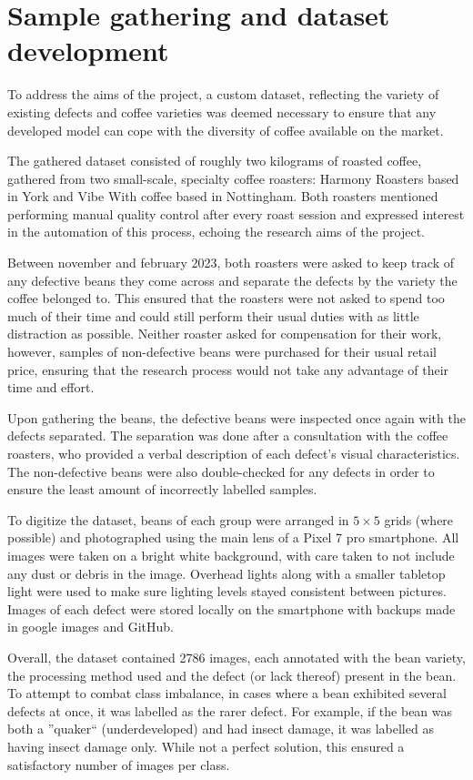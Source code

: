 \section{Sample gathering and dataset development}
\label{sec:sample-gathering-and-dataset-development}
To address the aims of the project, a custom dataset,
reflecting the variety of existing defects and coffee varieties was deemed necessary to
ensure that any developed model can cope with the diversity of coffee available
on the market.

The gathered dataset consisted of roughly two kilograms of roasted coffee, gathered
from two small-scale, specialty coffee roasters: Harmony Roasters based in York and Vibe
With coffee based in Nottingham.
Both roasters mentioned performing manual quality control
after every roast session and expressed interest in the automation of this process,
echoing the research aims of the project.

Between november and february 2023, both roasters were asked
to keep track of any defective beans they come across and separate the defects by
the variety the coffee belonged to.
This ensured that the roasters were not
asked to spend too much of their time and could still perform their usual duties
with as little distraction as possible.
Neither roaster asked for compensation for
their work, however, samples of non-defective beans were purchased for their usual
retail price, ensuring that the research process would not take any advantage of
their time and effort.

Upon gathering the beans, the defective beans were inspected once again with the defects separated.
The separation was done after a
consultation with the coffee roasters, who provided a verbal description of each
defect's visual characteristics.
The non-defective beans were also double-checked
for any defects in order to ensure the least amount of incorrectly labelled
samples.

To digitize the dataset, beans of each group were arranged in $5 \times 5$ grids
(where possible) and photographed using the main lens of a Pixel 7 pro smartphone.
All images were taken on a bright white background, with care taken to not include any dust or debris in the image.
Overhead lights along with a smaller tabletop light were used to make sure lighting levels stayed consistent between pictures.
Images of each defect were stored locally on the smartphone with backups made
in google images and GitHub.

Overall, the dataset contained 2786 images, each annotated with the bean variety,
the processing method used and the defect (or lack thereof) present in the bean.
To attempt to combat class imbalance, in cases where a bean
exhibited several defects at once, it was labelled as the rarer defect.
For
example, if the bean was both a ''quaker`` (underdeveloped) and had insect damage,
it was labelled as having insect damage only.
While not a perfect solution, this
ensured a satisfactory number of images per class.

